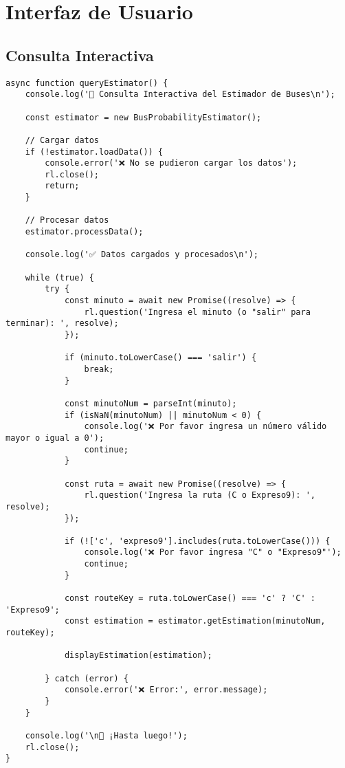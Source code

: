 \documentclass[12pt,a4paper]{article}
\begin{document}
\section{Interfaz de Usuario}

\subsection{Consulta Interactiva}

\begin{lstlisting}[caption=Interfaz de consulta interactiva]
async function queryEstimator() {
    console.log('🚌 Consulta Interactiva del Estimador de Buses\n');
    
    const estimator = new BusProbabilityEstimator();
    
    // Cargar datos
    if (!estimator.loadData()) {
        console.error('❌ No se pudieron cargar los datos');
        rl.close();
        return;
    }
    
    // Procesar datos
    estimator.processData();
    
    console.log('✅ Datos cargados y procesados\n');
    
    while (true) {
        try {
            const minuto = await new Promise((resolve) => {
                rl.question('Ingresa el minuto (o "salir" para terminar): ', resolve);
            });
            
            if (minuto.toLowerCase() === 'salir') {
                break;
            }
            
            const minutoNum = parseInt(minuto);
            if (isNaN(minutoNum) || minutoNum < 0) {
                console.log('❌ Por favor ingresa un número válido mayor o igual a 0');
                continue;
            }
            
            const ruta = await new Promise((resolve) => {
                rl.question('Ingresa la ruta (C o Expreso9): ', resolve);
            });
            
            if (!['c', 'expreso9'].includes(ruta.toLowerCase())) {
                console.log('❌ Por favor ingresa "C" o "Expreso9"');
                continue;
            }
            
            const routeKey = ruta.toLowerCase() === 'c' ? 'C' : 'Expreso9';
            const estimation = estimator.getEstimation(minutoNum, routeKey);
            
            displayEstimation(estimation);
            
        } catch (error) {
            console.error('❌ Error:', error.message);
        }
    }
    
    console.log('\n👋 ¡Hasta luego!');
    rl.close();
}
\end{lstlisting}
\end{document}
